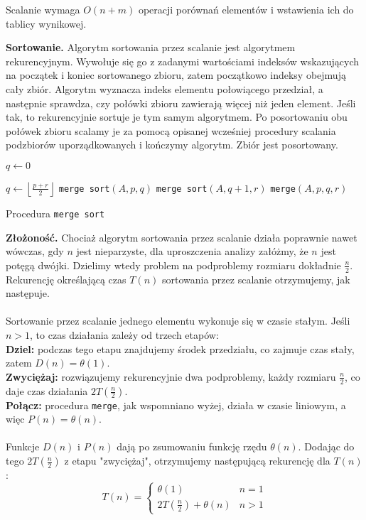 Scalanie wymaga $O(n+m)$ operacji porównań elementów i wstawienia ich do tablicy wynikowej. 

\textbf{Sortowanie.} Algorytm sortowania przez scalanie jest algorytmem rekurencyjnym. 
Wywołuje się go z zadanymi wartościami indeksów wskazujących na początek i koniec sortowanego zbioru, zatem początkowo indeksy obejmują cały zbiór. 
Algorytm wyznacza indeks elementu połowiącego przedział, a następnie sprawdza, czy połówki zbioru zawierają więcej niż jeden element. 
Jeśli tak, to rekurencyjnie sortuje je tym samym algorytmem.
Po posortowaniu obu połówek zbioru scalamy je za pomocą opisanej wcześniej procedury scalania podzbiorów uporządkowanych i kończymy algorytm. 
Zbiór jest posortowany.
\begin{algorithm}[h]

  \DontPrintSemicolon
  
  

  
  $q \leftarrow 0$\;
  
   {
  	$q \leftarrow \left \lfloor{\frac{p+r}{2}}\right \rfloor $\;
    \texttt{merge sort}$(A,p,q)$\;
 	\texttt{merge sort}$(A,q+1,r)$\;
    \texttt{merge}$(A,p,q,r)$\;
  }
  \caption{Procedura \texttt{merge sort}}
  \label{alg-merge-sort}
\end{algorithm}

\textbf{Złożoność.} Chociaż algorytm sortowania przez scalanie działa poprawnie nawet wówczas, gdy $n$ jest nieparzyste, dla uproszczenia analizy załóżmy, że $n$ jest potęgą dwójki. 
Dzielimy wtedy problem na podproblemy rozmiaru dokładnie $\frac{n}{2}$. 
Rekurencję określającą czas $T(n)$ sortowania przez scalanie otrzymujemy, jak następuje. \\\\
Sortowanie przez scalanie jednego elementu wykonuje się w czasie stałym. Jeśli $n > 1$, to czas działania zależy od trzech etapów:\\
\textbf{Dziel:} podczas tego etapu znajdujemy środek przedziału, co zajmuje czas stały, zatem $D(n) = \theta(1)$.\\
\textbf{Zwyciężaj:} rozwiązujemy rekurencyjnie dwa podproblemy, każdy rozmiaru $\frac{n}{2}$, co daje czas działania $2T(\frac{n}{2})$.\\
\textbf{Połącz:} procedura \texttt{merge}, jak wspomniano wyżej, działa w czasie liniowym, a więc $P(n) = \theta(n)$.\\\\
Funkcje $D(n)$ i $P(n)$ dają po zsumowaniu funkcję rzędu $\theta(n)$. 
Dodając do tego $2T(\frac{n}{2})$ z etapu "zwyciężaj", otrzymujemy następującą rekurencję dla $T(n)$:
$$
 T(n) = 
  \begin{cases} 
   \theta(1) & n = 1 \\
   2T(\frac{n}{2}) + \theta(n) & n > 1
  \end{cases}
$$

